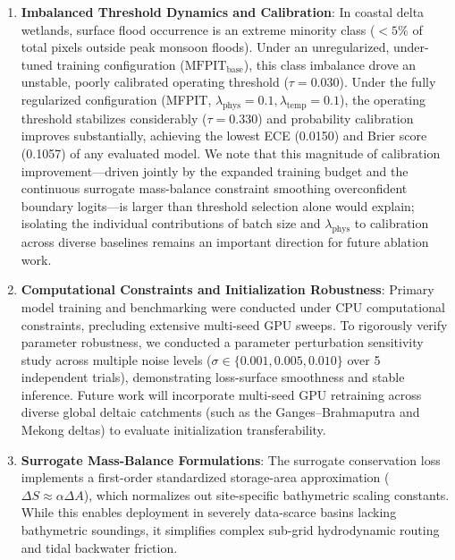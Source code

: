 \documentclass[preprint,12pt]{elsarticle}
\begin{document}
\begin{enumerate}
    \item \textbf{Imbalanced Threshold Dynamics and Calibration}: In coastal delta wetlands, surface flood occurrence is an extreme minority class ($<5\%$ of total pixels outside peak monsoon floods). Under an unregularized, under-tuned training configuration ($\text{MFPIT}_{\text{base}}$), this class imbalance drove an unstable, poorly calibrated operating threshold ($\tau = 0.030$). Under the fully regularized configuration (MFPIT, $\lambda_{\text{phys}} = 0.1, \lambda_{\text{temp}} = 0.1$), the operating threshold stabilizes considerably ($\tau = 0.330$) and probability calibration improves substantially, achieving the lowest ECE (0.0150) and Brier score (0.1057) of any evaluated model. We note that this magnitude of calibration improvement---driven jointly by the expanded training budget and the continuous surrogate mass-balance constraint smoothing overconfident boundary logits---is larger than threshold selection alone would explain; isolating the individual contributions of batch size and $\lambda_{\text{phys}}$ to calibration across diverse baselines remains an important direction for future ablation work.
    \item \textbf{Computational Constraints and Initialization Robustness}: Primary model training and benchmarking were conducted under CPU computational constraints, precluding extensive multi-seed GPU sweeps. To rigorously verify parameter robustness, we conducted a parameter perturbation sensitivity study across multiple noise levels ($\sigma \in \{0.001, 0.005, 0.010\}$ over 5 independent trials), demonstrating loss-surface smoothness and stable inference. Future work will incorporate multi-seed GPU retraining across diverse global deltaic catchments (such as the Ganges--Brahmaputra and Mekong deltas) to evaluate initialization transferability.
    \item \textbf{Surrogate Mass-Balance Formulations}: The surrogate conservation loss implements a first-order standardized storage-area approximation ($\Delta S \approx \alpha \Delta A$), which normalizes out site-specific bathymetric scaling constants. While this enables deployment in severely data-scarce basins lacking bathymetric soundings, it simplifies complex sub-grid hydrodynamic routing and tidal backwater friction.
\end{enumerate}
\end{document}
